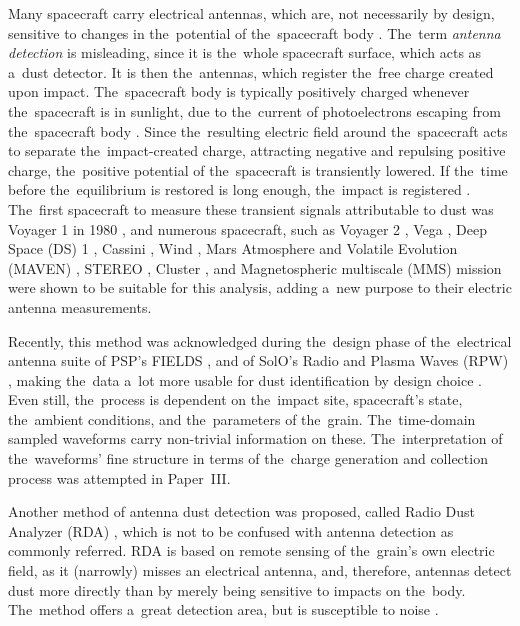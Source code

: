 Many spacecraft carry electrical antennas, which are, not necessarily by design, sensitive to changes in the~potential of the~spacecraft body \citep{meyer2017frequency}. The~term \textit{antenna detection} is misleading, since it is the~whole spacecraft surface, which acts as a~dust detector. It is then the~antennas, which register the~free charge created upon impact. The~spacecraft body is typically positively charged whenever the~spacecraft is in sunlight, due to the~current of photoelectrons escaping from the~spacecraft body \citep{guillemant2013simulation}. Since the~resulting electric field around the~spacecraft acts to separate the~impact-created charge, attracting negative and repulsing positive charge, the~positive potential of the~spacecraft is transiently lowered. If the~time before the~equilibrium is restored is long enough, the~impact is registered \citep{mann2019dust}. The~first spacecraft to measure these transient signals attributable to dust was Voyager 1 in 1980 \citep{scarf1982voyager,aubier1983shot,gurnett1997micron}, and numerous spacecraft, such as Voyager 2 \citep{gurnett1983micron}, Vega \citep{laakso1989impacts}, Deep Space ({DS}) 1 \citep{tsurutani2003dust}, Cassini \citep{kurth2006cassini}, Wind \citep{malaspina2014interplanetary}, Mars Atmosphere and Volatile Evolution ({MAVEN}) \citep{andersson2015dust}, STEREO \citep{zaslavsky2012interplanetary}, Cluster \citep{vaverka2017detection}, and Magnetospheric multiscale ({MMS}) mission \citep{vaverka2018comparison} were shown to be suitable for this analysis, adding a~new purpose to their electric antenna measurements. 

Recently, this method was acknowledged during the~design phase of the~electrical antenna suite of PSP's {FIELDS} \citep{bale2016fields}, and of SolO's Radio and Plasma Waves ({RPW}) \citep{maksimovic2020solar}, making the~data a~lot more usable for dust identification by design choice \citep{mann2019dust}. Even still, the~process is dependent on the~impact site, spacecraft's state, the~ambient conditions, and the~parameters of the~grain. The~time-domain sampled waveforms carry non-trivial information on these. The~interpretation of the~waveforms' fine structure in terms of the~charge generation and collection process was attempted in Paper~III. 

Another method of antenna dust detection was proposed, called Radio Dust Analyzer ({RDA}) \citep{lesceux1989electric}, which is not to be confused with antenna detection as commonly referred. RDA is based on remote sensing of the~grain's own electric field, as it (narrowly) misses an electrical antenna, and, therefore, antennas detect dust more directly than by merely being sensitive to impacts on the~body. The~method offers a~great detection area, but is susceptible to noise \citep{meuris1996detection,meyer2001detecting}. 


